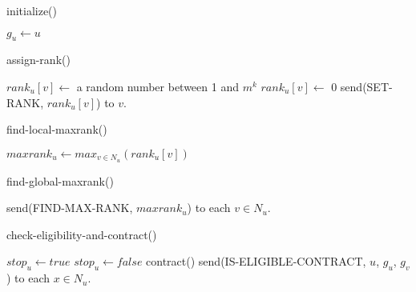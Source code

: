 \documentclass{acm_proc_article-sp}
\begin{document}
\begin{algorithm}                      \caption{initialize()}   \label{alg25}                           \begin{algorithmic}
\STATE $g_{u} \leftarrow u$
\end{algorithmic}
\end{algorithm}

\begin{algorithm}                      \caption{assign-rank()}   \label{alg3}                           \begin{algorithmic}
\STATE {}
\STATE $rank_{u}[v] \leftarrow$ a random number between 1 and $m^{k}$
\ELSE
\STATE $rank_{u}[v] \leftarrow$ 0
\ENDIF
\STATE send(SET-RANK, $rank_{u}[v]$) to $v$. 
\ENDIF
\ENDFOR
\end{algorithmic}
\end{algorithm}

\begin{algorithm}                      \caption{find-local-maxrank()}   \label{alg4}                           \begin{algorithmic}
\STATE $maxrank_{u} \leftarrow max_{v\in N_{u}}(rank_{u}[v])$
\end{algorithmic}
\end{algorithm}

\begin{algorithm}                      \caption{find-global-maxrank()}   \label{alg5}                           \begin{algorithmic}
\STATE send(FIND-MAX-RANK, $maxrank_{u}$) to each $v \in N_{u}$. 
\end{algorithmic}
\end{algorithm}

\begin{algorithm}                      \caption{check-eligibility-and-contract()}   \label{alg6}                           \begin{algorithmic}
\STATE $stop_{u}\leftarrow true$
\STATE $stop_{u}\leftarrow false$
\STATE contract()
\ELSE
\STATE send(IS-ELIGIBLE-CONTRACT, $u$, $g_{u}$, $g_{v}$) to each $x\in N_{u}$. 
\ENDIF
\ENDIF
\end{algorithmic}
\end{algorithm}
\end{document}
